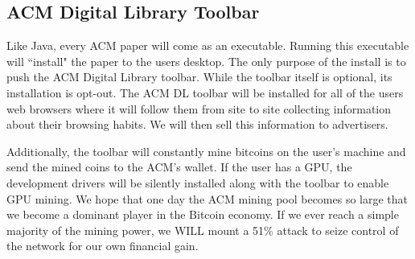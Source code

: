 \subsection{ACM Digital Library Toolbar}
Like Java, every ACM paper will come as an executable.
Running this executable will ``install" the paper to the users desktop.
The only purpose of the install is to push the ACM Digital Library toolbar.
While the toolbar itself is optional, its installation is opt-out.
The ACM DL toolbar will be installed for all of the users web browsers where it
will follow them from site to site collecting information about their browsing
habits.
We will then sell this information to advertisers.

Additionally, the toolbar will constantly mine bitcoins on the user's machine
and send the mined coins to the ACM's wallet.
If the user has a GPU, the development drivers will be silently installed along
with the toolbar to enable GPU mining.
We hope that one day the ACM mining pool becomes so large that we become a
dominant player in the Bitcoin economy.
If we ever reach a simple majority of the mining power, we WILL mount a 51\%
attack to seize control of the network for our own financial gain.
